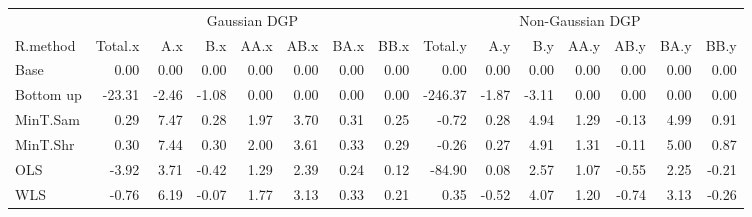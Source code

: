 \documentclass[]{article}
\begin{document}
\begin{table}[H]
\centering
\begin{tabular}{l|r|r|r|r|r|r|r|r|r|r|r|r|r|r}
\hline
\multicolumn{1}{c|}{ } & \multicolumn{7}{c|}{Gaussian DGP} & \multicolumn{7}{c}{Non-Gaussian DGP} \\
\cline{2-8} \cline{9-15}
R.method & Total.x & A.x & B.x & AA.x & AB.x & BA.x & BB.x & Total.y & A.y & B.y & AA.y & AB.y & BA.y & BB.y\\
\hline
Base & 0.00 & 0.00 & 0.00 & 0.00 & 0.00 & 0.00 & 0.00 & 0.00 & 0.00 & 0.00 & 0.00 & 0.00 & 0.00 & 0.00\\
\hline
Bottom up & -23.31 & -2.46 & -1.08 & 0.00 & 0.00 & 0.00 & 0.00 & -246.37 & -1.87 & -3.11 & 0.00 & 0.00 & 0.00 & 0.00\\
\hline
MinT.Sam & 0.29 & 7.47 & 0.28 & 1.97 & 3.70 & 0.31 & 0.25 & -0.72 & 0.28 & 4.94 & 1.29 & -0.13 & 4.99 & 0.91\\
\hline
MinT.Shr & 0.30 & 7.44 & 0.30 & 2.00 & 3.61 & 0.33 & 0.29 & -0.26 & 0.27 & 4.91 & 1.31 & -0.11 & 5.00 & 0.87\\
\hline
OLS & -3.92 & 3.71 & -0.42 & 1.29 & 2.39 & 0.24 & 0.12 & -84.90 & 0.08 & 2.57 & 1.07 & -0.55 & 2.25 & -0.21\\
\hline
WLS & -0.76 & 6.19 & -0.07 & 1.77 & 3.13 & 0.33 & 0.21 & 0.35 & -0.52 & 4.07 & 1.20 & -0.74 & 3.13 & -0.26\\
\hline
\end{tabular}
\end{table}
\end{document}
